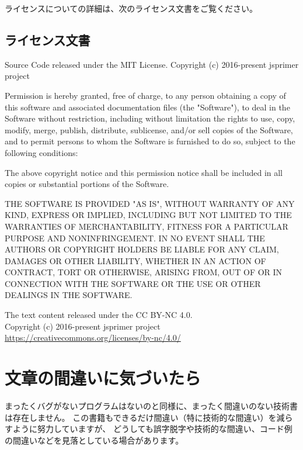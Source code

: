 ライセンスについての詳細は、次のライセンス文書をご覧ください。

\subsection*{ライセンス文書}

Source Code released under the MIT License.
Copyright (c) 2016-present jsprimer project

Permission is hereby granted, free of charge, to any person obtaining a copy
of this software and associated documentation files (the "Software"), to deal
in the Software without restriction, including without limitation the rights
to use, copy, modify, merge, publish, distribute, sublicense, and/or sell
copies of the Software, and to permit persons to whom the Software is
furnished to do so, subject to the following conditions:

The above copyright notice and this permission notice shall be included in all
copies or substantial portions of the Software.

THE SOFTWARE IS PROVIDED "AS IS", WITHOUT WARRANTY OF ANY KIND, EXPRESS OR
IMPLIED, INCLUDING BUT NOT LIMITED TO THE WARRANTIES OF MERCHANTABILITY,
FITNESS FOR A PARTICULAR PURPOSE AND NONINFRINGEMENT. IN NO EVENT SHALL THE
AUTHORS OR COPYRIGHT HOLDERS BE LIABLE FOR ANY CLAIM, DAMAGES OR OTHER
LIABILITY, WHETHER IN AN ACTION OF CONTRACT, TORT OR OTHERWISE, ARISING FROM,
OUT OF OR IN CONNECTION WITH THE SOFTWARE OR THE USE OR OTHER DEALINGS IN THE
SOFTWARE.

\noindent\hrulefill\hspace*{65mm}

\noindent The text content released under the CC BY-NC 4.0.\\
Copyright (c) 2016-present jsprimer project\\
\url{https://creativecommons.org/licenses/by-nc/4.0/}

\hypertarget{how-to-report-mistake}{%
\section*{文章の間違いに気づいたら}\label{how-to-report-mistake}}

まったくバグがないプログラムはないのと同様に、まったく間違いのない技術書は存在しません。
この書籍もできるだけ間違い（特に技術的な間違い）を減らすように努力していますが、
どうしても誤字脱字や技術的な間違い、コード例の間違いなどを見落としている場合があります。

